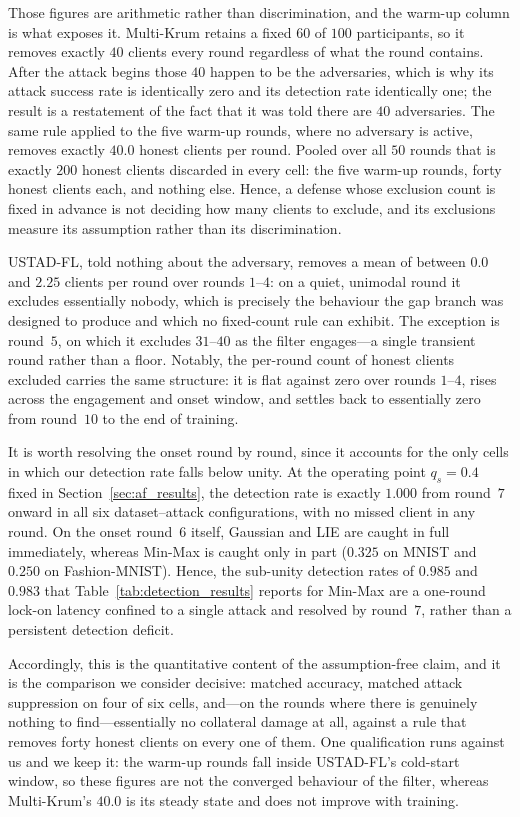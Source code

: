 \documentclass[journal]{IEEEtran}
\begin{document}
Those figures are arithmetic rather than discrimination, and the warm-up column is what
exposes it. Multi-Krum retains a fixed $60$ of $100$ participants, so it removes exactly $40$
clients every round regardless of what the round contains. After the attack begins those $40$
happen to be the adversaries, which is why its attack success rate is identically zero and its
detection rate identically one; the
result is a restatement of the fact that it was told there are $40$ adversaries. The same
rule applied to the five warm-up rounds, where no adversary is active, removes exactly $40.0$
honest clients per round. Pooled over all $50$ rounds that is exactly $200$ honest clients
discarded in every cell: the five warm-up rounds, forty honest clients each, and nothing else.
Hence, a defense whose exclusion count is fixed in advance is not deciding how many clients to
exclude, and its exclusions measure its assumption rather than its discrimination.

USTAD-FL, told nothing about the adversary, removes a mean of between $0.0$ and $2.25$ clients
per round over rounds $1$--$4$: on a quiet, unimodal round it excludes essentially nobody,
which is precisely the behaviour the gap branch was designed to produce and which no
fixed-count rule can exhibit. The exception is round~$5$, on which it excludes $31$--$40$ as
the filter engages---a single transient round rather than a floor. Notably, the per-round
count of honest clients excluded carries the same structure: it is flat against zero over
rounds $1$--$4$, rises across the engagement and onset window, and settles back to essentially
zero from round~$10$ to the end of training.

It is worth resolving the onset round by round, since it accounts for the only cells in which
our detection rate falls below unity. At the operating point $q_s = 0.4$ fixed in
Section~\ref{sec:af_results}, the detection rate is exactly $1.000$ from round~$7$ onward in
all six dataset--attack configurations, with no missed client in any round. On the onset
round~$6$ itself, Gaussian and LIE are caught in full immediately, whereas Min-Max is caught
only in part ($0.325$ on MNIST and $0.250$ on Fashion-MNIST). Hence, the sub-unity detection
rates of $0.985$ and $0.983$ that Table~\ref{tab:detection_results} reports for Min-Max are a
one-round lock-on latency confined to a single attack and resolved by round~$7$, rather than a
persistent detection deficit.

Accordingly, this is the quantitative content of the assumption-free claim, and it is the
comparison we consider decisive: matched accuracy, matched attack suppression on four of six cells, and---on
the rounds where there is genuinely nothing to find---essentially no collateral damage at all,
against a rule that removes forty honest clients on every one of them. One qualification runs
against us and we keep it: the warm-up rounds fall inside USTAD-FL's cold-start window, so
these figures are not the converged behaviour of the filter, whereas Multi-Krum's $40.0$ is
its steady state and does not improve with training.
\end{document}
